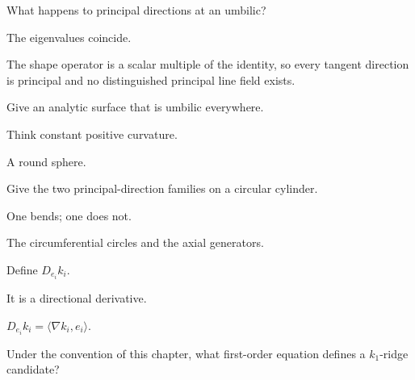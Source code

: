 \begin{exercise}\label{exr:vii42-06}
What happens to principal directions at an umbilic?
\end{exercise}

\begin{hint}
The eigenvalues coincide.
\end{hint}

\begin{solution}
The shape operator is a scalar multiple of the identity, so every tangent direction is principal and no distinguished principal line field exists.
\end{solution}

\begin{exercise}\label{exr:vii42-07}
Give an analytic surface that is umbilic everywhere.
\end{exercise}

\begin{hint}
Think constant positive curvature.
\end{hint}

\begin{solution}
A round sphere.
\end{solution}

\begin{exercise}\label{exr:vii42-08}
Give the two principal-direction families on a circular cylinder.
\end{exercise}

\begin{hint}
One bends; one does not.
\end{hint}

\begin{solution}
The circumferential circles and the axial generators.
\end{solution}

\begin{exercise}\label{exr:vii42-09}
Define \(D_{e_i}k_i\).
\end{exercise}

\begin{hint}
It is a directional derivative.
\end{hint}

\begin{solution}
\(D_{e_i}k_i=\langle\nabla k_i,e_i\rangle\).
\end{solution}

\begin{exercise}\label{exr:vii42-10}
Under the convention of this chapter, what first-order equation defines a \(k_1\)-ridge candidate?
\end{exercise}

